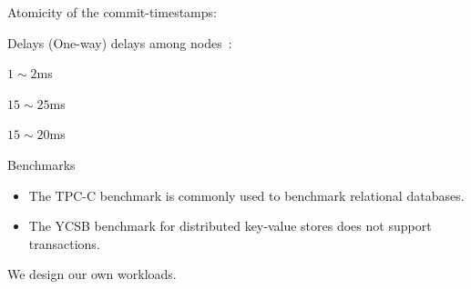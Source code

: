 \begin{frame}{}
  \begin{center}
    \begin{minipage}{1.0\textwidth}
      
    \end{minipage}
  \end{center}
\end{frame}

\begin{frame}{}
  \begin{center}
  \end{center}
\end{frame}

\begin{frame}{}
  \begin{center}
    \begin{minipage}{1.0\textwidth}
      
    \end{minipage}
  \end{center}
\end{frame}

\begin{frame}{}
  Atomicity of the commit-timestamps:

\end{frame}

\begin{frame}{Delays}
  (One-way) delays among nodes~\footnotemark:
  \begin{description}
    \item[Within datacenter:] $1 \sim 2$ms
    \item[Across datacenters:] $15 \sim 25$ms
    \item[Clients to nodes:] $15 \sim 20$ms
  \end{description}

\end{frame}

\begin{frame}{Benchmarks}
  \begin{itemize}
    \item The TPC-C benchmark is commonly used to benchmark relational databases.
    \item The YCSB benchmark  for distributed key-value stores
      does not support transactions.
  \end{itemize}

  \vspace{0.60cm}
  \centerline{We design our own workloads.}
\end{frame}

